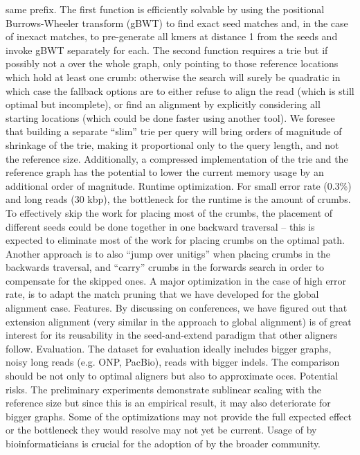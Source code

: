 same prefix. The first function is efficiently solvable by using the positional
Burrows-Wheeler transform (gBWT) to find exact seed matches and, in the case of
inexact matches, to pre-generate all kmers at distance 1 from the seeds and
invoke gBWT separately for each. The second function requires a trie but if
possibly not a over the whole graph, only pointing to those reference locations
which hold at least one crumb: otherwise the \A search will surely be quadratic
in which case the fallback options are to either refuse to align the read (which
is still optimal but incomplete), or find an alignment by explicitly considering
all starting locations (which could be done faster using another tool). We
foresee that building a separate “slim” trie per query will bring orders of
magnitude of shrinkage of the trie, making it proportional only to the query
length, and not the reference size. Additionally, a compressed implementation of
the trie and the reference graph has the potential to lower the current memory
usage by an additional order of magnitude. Runtime optimization. For small error
rate (0.3\%) and long reads (30 kbp), the bottleneck for the runtime is the
amount of crumbs. To effectively skip the work for placing most of the crumbs,
the placement of different seeds could be done together in one backward
traversal – this is expected to eliminate most of the work for placing crumbs on
the optimal path.  Another approach is to also “jump over unitigs” when placing
crumbs in the backwards traversal, and “carry” crumbs in the forwards \A search
in order to compensate for the skipped ones. A major optimization in the case of
high error rate, is to adapt the match pruning that we have developed for the
global alignment case. Features. By discussing \astarix on conferences, we have
figured out that extension alignment (very similar in the approach to global
alignment) is of great interest for its reusability in the seed-and-extend
paradigm that other aligners follow. Evaluation. The dataset for evaluation
ideally includes bigger graphs, noisy long reads (e.g. ONP, PacBio), reads with
bigger indels. The comparison should be not only to optimal aligners but also to
approximate oces. Potential risks. The preliminary experiments demonstrate
sublinear scaling with the reference size but since this is an empirical result,
it may also deteriorate for bigger graphs. Some of the optimizations may not
provide the full expected effect or the bottleneck they would resolve may not
yet be current. Usage of \astarix by bioinformaticians is crucial for the
adoption of \astarix by the broader community.

